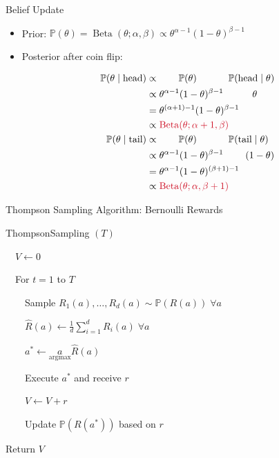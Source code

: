 \documentclass[11pt,table]{beamer}
\begin{document}
\begin{frame}{Belief Update}
    \begin{itemize}
        \item Prior: $\mathbb{P}(\theta)=\operatorname{Beta}(\theta ; \alpha, \beta) \propto \theta^{\alpha-1}(1-\theta)^{\beta-1}$

\item  Posterior after coin flip:

$$
\begin{aligned}
\mathbb{P}(\theta \mid \text{head}) & \propto \quad\quad\mathbb{P}(\theta) \quad\quad\quad\; \mathbb{P}(\text{head} \mid \theta) \\
& \propto \theta^{\alpha-1}(1-\theta)^{\beta-1} \quad\quad\quad \theta \\
& =\theta^{(\alpha+1)-1}(1-\theta)^{\beta-1} \\
& \propto \textcolor{red1}{\operatorname{Beta}(\theta ; \alpha+1, \beta)} \\
\mathbb{P}(\theta \mid \text{tail}) & \propto \quad\quad\mathbb{P}(\theta) \quad\quad\quad\; \mathbb{P}(\text{tail} \mid \theta) \\
& \propto \theta^{\alpha-1}(1-\theta)^{\beta-1} \quad\quad\;(1-\theta) \\
& =\theta^{\alpha-1}(1-\theta)^{(\beta+1)-1} \\
& \propto \textcolor{red1}{\operatorname{Beta}(\theta ; \alpha, \beta+1)}
\end{aligned}
$$ 
    \end{itemize}
\end{frame}




\begin{frame}{Thompson Sampling Algorithm: Bernoulli Rewards}
    


\begin{tcolorbox}[colframe=black, boxrule=1pt, sharp corners]

\textcolor{red1}{ThompsonSampling $(T)$}

$\quad$$V \leftarrow 0$

$\quad$For $t=1$ to $T$

$\quad$$\quad$Sample $R_1(a), \ldots, R_d(a) \sim \mathbb{P}(R(a)) \; \forall a$

$\quad$$\quad$$\hat{R}(a) \leftarrow \frac{1}{d} \sum_{i=1}^d R_i(a)  \; \forall a$

$\quad$$\quad$$a^* \leftarrow \underset{\operatorname{argmax}}{a} \hat{R}(a)$

$\quad$$\quad$Execute $a^*$ and receive $r$

$\quad$$\quad$$V \leftarrow V+r$

$\quad$$\quad$Update $\mathbb{P}\left(R\left(a^*\right)\right)$ based on $r$

Return $V$




\end{tcolorbox}

\end{frame}
\end{document}
